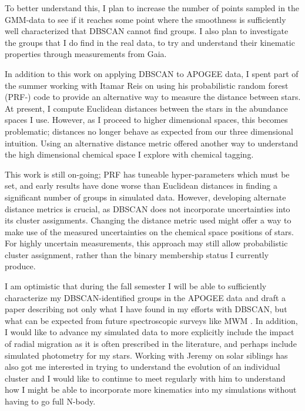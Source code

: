 \documentclass[11pt]{article}
\begin{document}
To better understand this, I plan to increase the number of points sampled in the GMM-data to see if it reaches some point where the smoothness is sufficiently well characterized that DBSCAN cannot find groups. I also plan to investigate the groups that I do find in the real data, to try and understand their kinematic properties through measurements from Gaia. 

In addition to this work on applying DBSCAN to APOGEE data, I spent part of the summer working with Itamar Reis on using his probabilistic random forest (PRF-\citealt{Reis2018}) code to provide an alternative way to measure the distance between stars. At present, I compute Euclidean distances between the stars in the abundance spaces I use. However, as I proceed to higher dimensional spaces, this becomes problematic; distances no longer behave as expected from our three dimensional intuition. Using an alternative distance metric offered another way to understand the high dimensional chemical space I explore with chemical tagging.

This work is still on-going; PRF has tuneable hyper-parameters which must be set, and early results have done worse than Euclidean distances in finding a significant number of groups in simulated data. However, developing alternate distance metrics is crucial, as DBSCAN does not incorporate uncertainties into its cluster assignments. Changing the distance metric used might offer a way to make use of the measured uncertainties on the chemical space positions of stars. For highly uncertain measurements, this approach may still allow probabilistic cluster assignment, rather than the binary membership status I currently produce.

I am optimistic that during the fall semester I will be able to sufficiently characterize my DBSCAN-identified groups in the APOGEE data and draft a paper describing not only what I have found in my efforts with DBSCAN, but what can be expected from future spectroscopic surveys like MWM \citep{Kollmeier2017}. In addition, I would like to advance my simulated data to more explicitly include the impact of radial migration as it is often prescribed in the literature, and perhaps include simulated photometry for my stars. Working with Jeremy on solar siblings has also got me interested in trying to understand the evolution of an individual cluster and I would like to continue to meet regularly with him to understand how I might be able to incorporate more kinematics into my simulations without having to go full N-body. 



\end{document}
